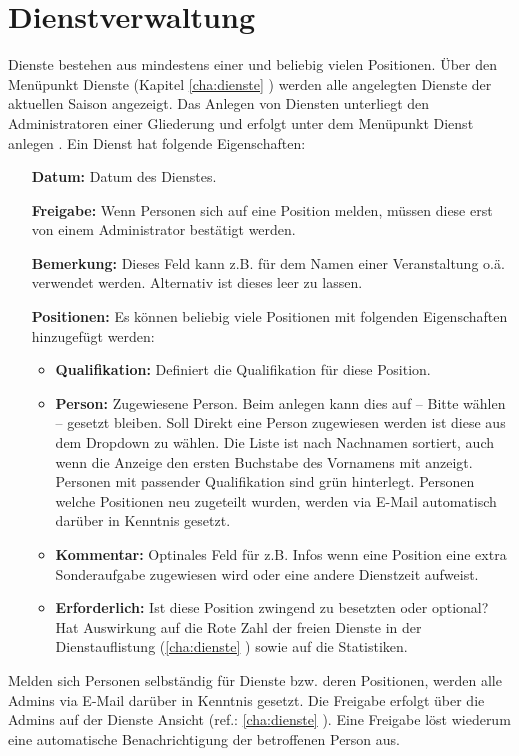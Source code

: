 \section{Dienstverwaltung}
\label{sec:admin_service}
Dienste bestehen aus mindestens einer und beliebig vielen Positionen. Über den Menüpunkt Dienste (Kapitel \ref{cha:dienste} ) werden alle angelegten Dienste der aktuellen Saison angezeigt. Das Anlegen von Diensten unterliegt den Administratoren einer Gliederung und erfolgt unter dem Menüpunkt \glqq Dienst anlegen \grqq{}. Ein Dienst hat folgende Eigenschaften:

\begin{itemize}
	\item[\textbf{Datum:}] Datum des Dienstes.
	\item[\textbf{Freigabe:}] Wenn Personen sich auf eine Position melden, müssen diese erst von einem Administrator bestätigt werden.
	\item[\textbf{Bemerkung:}] Dieses Feld kann z.B. für dem Namen einer Veranstaltung o.ä. verwendet werden. Alternativ ist dieses leer zu lassen.
	\item[\textbf{Positionen:}] Es können beliebig viele Positionen mit folgenden Eigenschaften hinzugefügt werden:
	\begin{itemize}
		\item \textbf{Qualifikation:} Definiert die Qualifikation für diese Position.
		\item \textbf{Person:} Zugewiesene Person. Beim anlegen kann dies auf \glqq -- Bitte wählen -- \grqq{} gesetzt bleiben. Soll Direkt eine Person zugewiesen werden ist diese aus dem Dropdown zu wählen. Die Liste ist nach Nachnamen sortiert, auch wenn die Anzeige den ersten Buchstabe des Vornamens mit anzeigt. Personen mit passender Qualifikation sind grün hinterlegt. Personen welche Positionen neu zugeteilt wurden, werden via E-Mail automatisch darüber in Kenntnis gesetzt.
		\item \textbf{Kommentar:} Optinales Feld für z.B. Infos wenn eine Position eine extra Sonderaufgabe zugewiesen wird oder eine andere Dienstzeit aufweist.
		\item \textbf{Erforderlich:} Ist diese Position zwingend zu besetzten oder optional? Hat Auswirkung auf die Rote Zahl der freien Dienste in der Dienstauflistung (\ref{cha:dienste} ) sowie auf die Statistiken.
	\end{itemize}
\end{itemize}
Melden sich Personen selbständig für Dienste bzw. deren Positionen, werden alle Admins via E-Mail darüber in Kenntnis gesetzt. Die Freigabe erfolgt über die Admins auf der Dienste Ansicht (ref.: \ref{cha:dienste} ). Eine Freigabe löst wiederum eine automatische Benachrichtigung der betroffenen Person aus.

